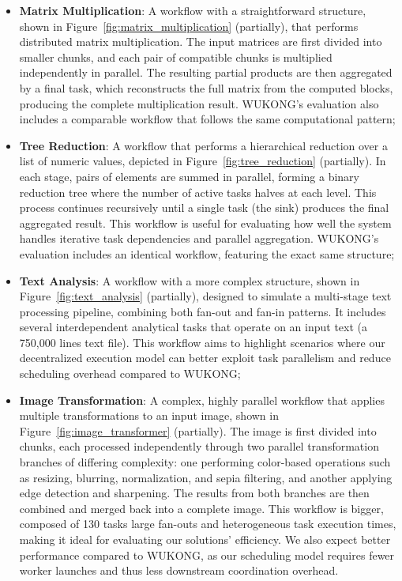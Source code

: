 \begin{itemize}
    \item \textbf{Matrix Multiplication}: A workflow with a straightforward structure, shown in Figure~\ref{fig:matrix_multiplication} (partially), that performs distributed matrix multiplication. The input matrices are first divided into smaller chunks, and each pair of compatible chunks is multiplied independently in parallel. The resulting partial products are then aggregated by a final task, which reconstructs the full matrix from the computed blocks, producing the complete multiplication result. WUKONG's evaluation also includes a comparable workflow that follows the same computational pattern;

    \item \textbf{Tree Reduction}: A workflow that performs a hierarchical reduction over a list of numeric values, depicted in Figure~\ref{fig:tree_reduction} (partially). In each stage, pairs of elements are summed in parallel, forming a binary reduction tree where the number of active tasks halves at each level. This process continues recursively until a single task (the sink) produces the final aggregated result. This workflow is useful for evaluating how well the system handles iterative task dependencies and parallel aggregation. WUKONG's evaluation includes an identical workflow, featuring the exact same structure;

    \item \textbf{Text Analysis}: A workflow with a more complex structure, shown in Figure~\ref{fig:text_analysis} (partially), designed to simulate a multi-stage text processing pipeline, combining both fan-out and fan-in patterns. It includes several interdependent analytical tasks that operate on an input text (a 750,000 lines text file). This workflow aims to highlight scenarios where our decentralized execution model can better exploit task parallelism and reduce scheduling overhead compared to WUKONG;

    \item \textbf{Image Transformation}: A complex, highly parallel workflow that applies multiple transformations to an input image, shown in Figure~\ref{fig:image_transformer} (partially). The image is first divided into chunks, each processed independently through two parallel transformation branches of differing complexity: one performing color-based operations such as resizing, blurring, normalization, and sepia filtering, and another applying edge detection and sharpening. The results from both branches are then combined and merged back into a complete image. This workflow is bigger, composed of 130 tasks large fan-outs and heterogeneous task execution times, making it ideal for evaluating our solutions' efficiency. We also expect better performance compared to WUKONG, as our scheduling model requires fewer worker launches and thus less downstream coordination overhead.
\end{itemize}

